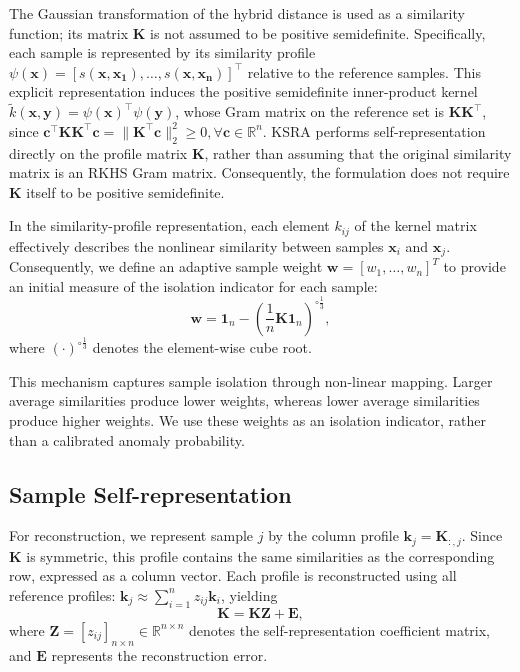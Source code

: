 \documentclass[ASNA,twocolumn]{USG} %
\begin{document}
The Gaussian transformation of the hybrid distance is used as a similarity function; its matrix $\boldsymbol{K}$ is not assumed to be positive semidefinite. Specifically, each sample is represented by its similarity profile $\psi(\boldsymbol{x})=[s(\boldsymbol{x},\boldsymbol{x_1}),\ldots,s(\boldsymbol{x},\boldsymbol{x_n})]^\top$ relative to the reference samples. This explicit representation induces the positive semidefinite inner-product kernel $\widetilde{ k}(\boldsymbol{x},\boldsymbol{y})=\psi(\boldsymbol{x})^\top\psi(\boldsymbol{y})$, whose Gram matrix on the reference set is $\boldsymbol{K}\boldsymbol{K}^\top$, since $\boldsymbol{c}^\top \boldsymbol{K}\boldsymbol{K}^\top \boldsymbol{c}=\|\boldsymbol{K}^\top \boldsymbol{c}\|_2^2\geq0, \forall\boldsymbol {c}\in\mathbb R^n$. KSRA performs self-representation directly on the profile matrix $\boldsymbol{K}$, rather than assuming that the original similarity matrix is an RKHS Gram matrix. Consequently, the formulation does not require $\boldsymbol{K}$ itself to be positive semidefinite.

In the similarity-profile representation, each element $k_{ij}$ of the kernel matrix effectively describes the nonlinear similarity between samples $\boldsymbol{x}_i$ and $\boldsymbol{x}_j$. Consequently, we define an adaptive sample weight $\boldsymbol{w} = [w_1, \dots, w_n]^T$ to provide an initial measure of the isolation indicator for each sample:
\begin{equation}\label{initial_anomaly_belief}
\boldsymbol{w} = \boldsymbol{1}_n - \left( \frac{1}{n} \boldsymbol{K}\boldsymbol{1}_n \right)^{\circ \frac{1}{3}},
\end{equation}
where $(\cdot)^{\circ \frac{1}{3}}$ denotes the element-wise cube root.

This mechanism captures sample isolation through non-linear mapping. Larger average similarities produce lower weights, whereas lower average similarities produce higher weights. We use these weights as an isolation indicator, rather than a calibrated anomaly probability.

\subsection{Sample Self-representation}

For reconstruction, we represent sample $j$ by the column profile $\boldsymbol{k}_j=\boldsymbol{K}_{:,j}$. Since $\boldsymbol K$ is symmetric, this profile contains the same similarities as the corresponding row, expressed as a column vector. Each profile is reconstructed using all reference profiles:
$\boldsymbol{k}_j\approx\sum_{i=1}^{n}z_{ij}\boldsymbol{k}_i$, yielding
\begin{equation}
\boldsymbol{K} = \boldsymbol{K} \boldsymbol{Z} + \boldsymbol{E},
\end{equation}
where $\boldsymbol{Z} = [z_{ij}]_{n \times n} \in \mathbb{R}^{n \times n}$ denotes the self-representation coefficient matrix, and $\boldsymbol{E}$ represents the reconstruction error. 
\end{document}

